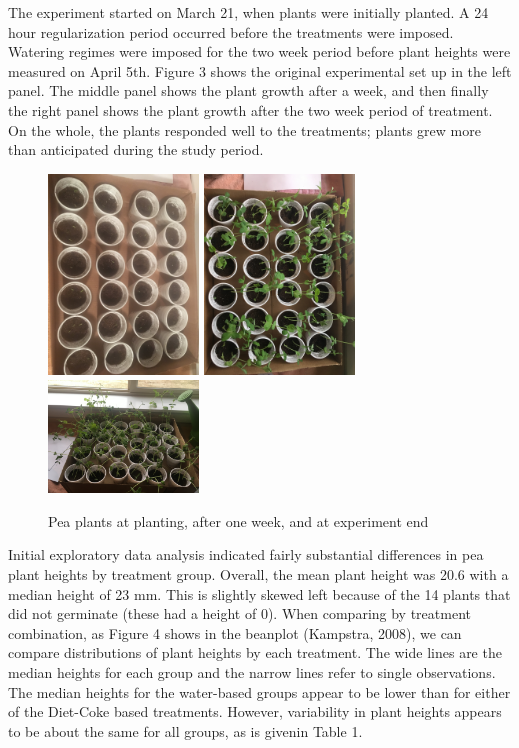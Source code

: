 \documentclass[1p,12pt]{elsarticle}\usepackage[]{graphicx}\usepackage[]{color}
\begin{document}
The experiment started on March 21, when plants were initially planted. A 24 hour regularization period occurred before the treatments were imposed. Watering regimes were imposed for the two week period before plant heights were measured on April 5th. Figure 3 shows the original experimental set up in the left panel. The middle panel shows the plant growth after a week, and then finally the right panel shows the plant growth after the two week period of treatment.  On the whole, the plants responded well to the treatments; plants grew more than anticipated during the study period. 
 \begin{figure}[h!]
 	\caption{Pea plants at planting, after one week, and at experiment end}
 	\centering
	\includegraphics[width = 4cm]{figure/initial_growth.JPG}
	\includegraphics[width = 4cm]{figure/lategrowth.JPG}
	\includegraphics[width = 4cm]{figure/2weeks.JPG}
\end{figure}

Initial exploratory data analysis indicated fairly substantial differences in pea plant heights by treatment group. Overall, the mean plant height was 20.6 with a median height of 23 mm. This is slightly skewed left because of the 14 plants that did not germinate (these had a height of 0). When comparing by treatment combination, as Figure 4 shows in the beanplot (Kampstra, 2008), we can compare distributions of plant heights by each treatment. The wide lines are the median heights for each group and the narrow lines refer to single observations. The median heights for the water-based groups appear to be lower than for either of the Diet-Coke based treatments. However, variability in plant heights appears to be about the same for all groups, as is givenin Table 1. 
\end{document}
